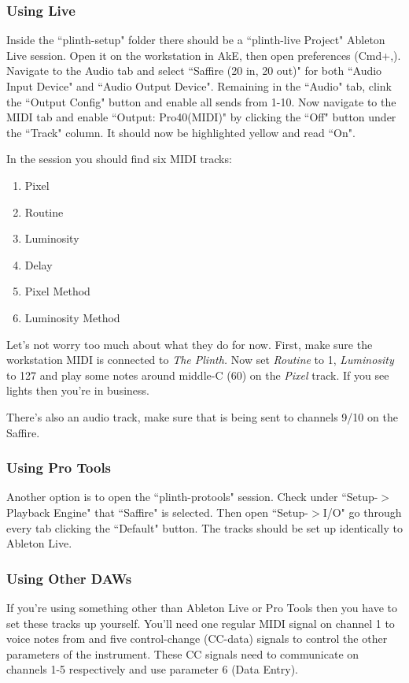 \documentclass{article}
\begin{document}
	\subsubsection{Using Live}
	Inside the ``plinth-setup" folder there should be a ``plinth-live Project" 
	Ableton Live session. Open it on the workstation in AkE, then open 
	preferences (Cmd+,). Navigate to the Audio tab and select ``Saffire (20 in, 
	20 out)" for both ``Audio Input Device" and ``Audio Output Device". 
	Remaining in the ``Audio" tab, clink the ``Output Config" button and enable 	all sends from 1-10. Now navigate to the MIDI tab and enable ``Output: 
	Pro40(MIDI)" by clicking the ``Off" button under the ``Track" column. It 
	should now be highlighted yellow and read ``On".
	
	In the session you should find six MIDI tracks:
	\begin{enumerate}
		\item Pixel
		\item Routine
		\item Luminosity
		\item Delay
		\item Pixel Method
		\item Luminosity Method
	\end{enumerate}
	Let's not worry too much about what they do for now. First, make sure the 
	workstation MIDI is connected to \emph{The Plinth.} Now set \emph{Routine} 
	to 1, \emph{Luminosity} to 127 and play some notes around middle-C (60) on 
	the \emph{Pixel} track. If you see lights then you're in business.

	There's also an audio track, make sure that is being sent to channels 9/10 
	on the Saffire.

	\subsubsection{Using Pro Tools}
	Another option is to open the ``plinth-protools" session. Check under 
	``Setup-$>$Playback Engine" that ``Saffire" is selected. Then open 
	``Setup-$>$I/O" go through every tab clicking the ``Default" button. The 
	tracks should be set up identically to Ableton Live.

	\subsubsection{Using Other DAWs}
	If you're using something other than Ableton Live or Pro Tools then you 
	have to set these tracks up yourself. You'll need one regular MIDI signal 
	on channel 1 to voice notes from and five control-change (CC-data) signals 
	to control the other parameters of the instrument. These CC signals need to 
	communicate on channels 1-5 respectively and use parameter 6 (Data Entry). 
	
\end{document}
